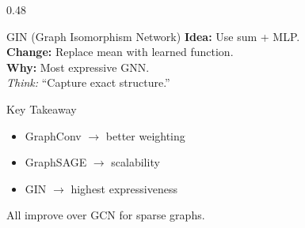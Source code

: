 \documentclass[10pt,aspectratio=43]{beamer}
\begin{document}
\begin{frame}
\begin{columns}[T]
\begin{column}{0.48\textwidth}
\begin{exampleblock}{GIN (Graph Isomorphism Network)}
\small
\textbf{Idea:} Use sum + MLP.\\
\textbf{Change:} Replace mean with learned function.\\
\textbf{Why:} \alert{Most expressive GNN}.\\
\textit{Think:} “Capture exact structure.”
\end{exampleblock}

\vspace{0.2em}

\begin{alertblock}{Key Takeaway}
\small
\begin{itemize}
\item GraphConv $\rightarrow$ better weighting  
\item GraphSAGE $\rightarrow$ scalability  
\item GIN $\rightarrow$ \alert{highest expressiveness}  
\end{itemize}
All improve over GCN for sparse graphs.
\end{alertblock}

\end{column}

\end{columns}

\end{frame}
\end{document}
